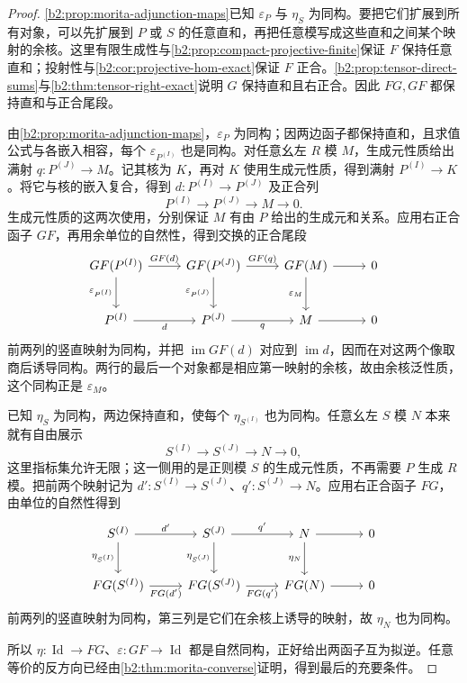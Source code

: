 \begin{proof}
	\cref{b2:prop:morita-adjunction-maps}已知 \(\varepsilon_P\) 与 \(\eta_S\) 为同构。要把它们扩展到所有对象，可以先扩展到 \(P\) 或 \(S\) 的任意直和，再把任意模写成这些直和之间某个映射的余核。这里有限生成性与\cref{b2:prop:compact-projective-finite}保证 \(F\) 保持任意直和；投射性与\cref{b2:cor:projective-hom-exact}保证 \(F\) 正合。\cref{b2:prop:tensor-direct-sums}与\cref{b2:thm:tensor-right-exact}说明 \(G\) 保持直和且右正合。因此 \(FG,GF\) 都保持直和与正合尾段。

	由\cref{b2:prop:morita-adjunction-maps}，\(\varepsilon_P\) 为同构；因两边函子都保持直和，且求值公式与各嵌入相容，每个 \(\varepsilon_{P^{(I)}}\) 也是同构。对任意幺左 \(R\) 模 \(M\)，生成元性质给出满射 \(q:P^{(J)}\rightarrow M\)。记其核为 \(K\)，再对 \(K\) 使用生成元性质，得到满射 \(P^{(I)}\rightarrow K\)。将它与核的嵌入复合，得到 \(d:P^{(I)}\rightarrow P^{(J)}\) 及正合列
	\[
		P^{(I)}\longrightarrow P^{(J)}\longrightarrow M\longrightarrow0.
	\]
	生成元性质的这两次使用，分别保证 \(M\) 有由 \(P\) 给出的生成元和关系。应用右正合函子 \(GF\)，再用余单位的自然性，得到交换的正合尾段
	\[
		\begin{tikzcd}[column sep=2.6em,row sep=2.5em]
			GF(P^{(I)}) \arrow[r,"GF(d)"] \arrow[d,"\varepsilon_{P^{(I)}}"'] & GF(P^{(J)}) \arrow[r,"GF(q)"] \arrow[d,"\varepsilon_{P^{(J)}}"'] & GF(M) \arrow[r] \arrow[d,"\varepsilon_M"'] & 0\\
			P^{(I)} \arrow[r,"d"'] & P^{(J)} \arrow[r,"q"'] & M \arrow[r] & 0
		\end{tikzcd}
	\]
	前两列的竖直映射为同构，并把 \(\operatorname{im}GF(d)\) 对应到 \(\operatorname{im}d\)，因而在对这两个像取商后诱导同构。两行的最后一个对象都是相应第一映射的余核，故由余核泛性质，这个同构正是 \(\varepsilon_M\)。

	已知 \(\eta_S\) 为同构，两边保持直和，使每个 \(\eta_{S^{(I)}}\) 也为同构。任意幺左 \(S\) 模 \(N\) 本来就有自由展示
	\[
		S^{(I)}\longrightarrow S^{(J)}\longrightarrow N\longrightarrow0,
	\]
	这里指标集允许无限；这一侧用的是正则模 \(S\) 的生成元性质，不再需要 \(P\) 生成 \(R\) 模。把前两个映射记为 \(d':S^{(I)}\to S^{(J)}\)、\(q':S^{(J)}\to N\)。应用右正合函子 \(FG\)，由单位的自然性得到
	\[
		\begin{tikzcd}[column sep=2.6em,row sep=2.5em]
			S^{(I)} \arrow[r,"d'"] \arrow[d,"\eta_{S^{(I)}}"'] & S^{(J)} \arrow[r,"q'"] \arrow[d,"\eta_{S^{(J)}}"'] & N \arrow[r] \arrow[d,"\eta_N"'] & 0\\
			FG(S^{(I)}) \arrow[r,"FG(d')"'] & FG(S^{(J)}) \arrow[r,"FG(q')"'] & FG(N) \arrow[r] & 0
		\end{tikzcd}
	\]
	前两列的竖直映射为同构，第三列是它们在余核上诱导的映射，故 \(\eta_N\) 也为同构。

	所以 \(\eta:\operatorname{Id}\rightarrow FG\)、\(\varepsilon:GF\rightarrow\operatorname{Id}\) 都是自然同构，正好给出两函子互为拟逆。任意等价的反方向已经由\cref{b2:thm:morita-converse}证明，得到最后的充要条件。
\end{proof}

